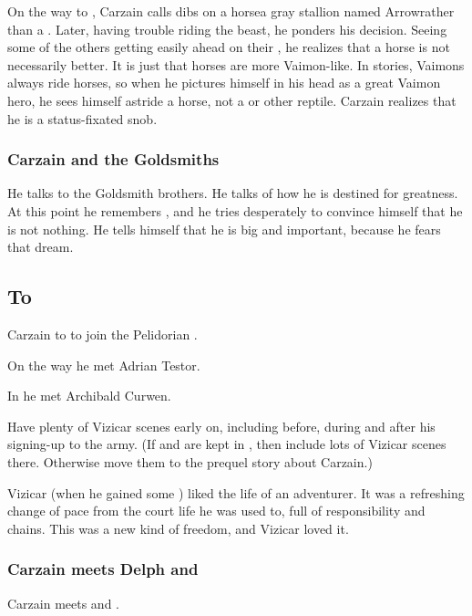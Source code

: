 On the way to \Malcur, Carzain calls dibs on a horse\dash a gray stallion named Arrow\dash rather than a \relc. Later, having trouble riding the beast, he ponders his decision. Seeing some of the others getting easily ahead on their \relcs, he realizes that a horse is not necessarily better. It is just that horses are more Vaimon-like. In stories, Vaimons always ride horses, so when he pictures himself in his head as a great Vaimon hero, he sees himself astride a horse, not a \relc or other reptile. Carzain realizes that he is a status-fixated snob. 





\subsubsection{Carzain and the Goldsmiths}
He talks to the Goldsmith brothers. 
He talks of how he is destined for greatness. 
At this point he remembers , and he tries desperately to convince himself that he is not nothing. 
He tells himself that he is big and important, because he fears that dream. 









\subsection[To Malcur]{To \Malcur}
Carzain \travelled to \Malcur to join the Pelidorian \ishrah.

On the way he met Adrian Testor. 

In \Malcur he met Archibald Curwen. 

Have plenty of Vizicar scenes early on, including before, during and after his signing-up to the army. 
(If  and  are kept in \TwilightAngelRememberEmph, then include lots of Vizicar scenes there. Otherwise move them to the prequel story about Carzain.)

Vizicar (when he gained some \kenosis) liked the life of an adventurer. 
It was a refreshing change of pace from the court life he was used to, full of responsibility and chains. 
This was a new kind of freedom, and Vizicar loved it. 





\subsubsection[Carzain meets Delph and Tsekkect]{Carzain meets Delph and \Tsekkect}
Carzain meets  and .

